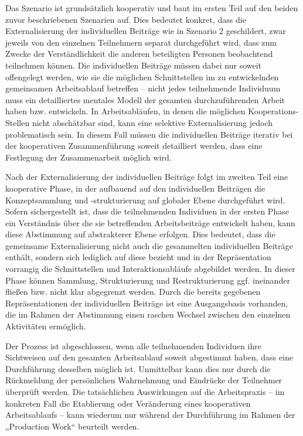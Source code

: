 Das Szenario ist grundsätzlich kooperativ und baut im ersten Teil auf den beiden zuvor beschriebenen Szenarien auf. Dies bedeutet konkret, dass die Externalisierung der individuellen Beiträge wie in Szenario 2 geschildert, zwar jeweils von den einzelnen Teilnehmern separat durchgeführt wird, dass zum Zwecke der Verständlichkeit die anderen beteiligten Personen beobachtend teilnehmen können. Die individuellen Beiträge müssen dabei nur soweit offengelegt werden, wie sie die möglichen Schnittstellen im zu entwickelnden gemeinsamen Arbeitsablauf betreffen -- nicht jedes teilnehmende Individuum muss ein detailliertes mentales Modell der gesamten durchzuführenden Arbeit haben bzw. entwickeln. In Arbeitsabläufen, in denen die möglichen Kooperations-Stellen nicht abschätzbar sind, kann eine selektive Externalisierung jedoch problematisch sein. In diesem Fall müssen die individuellen Beiträge iterativ bei der kooperativen Zusammenführung soweit detailliert werden, dass eine Festlegung der Zusammenarbeit möglich wird.

Nach der Externalisierung der individuellen Beiträge folgt im zweiten Teil eine kooperative Phase, in der aufbauend auf den individuellen Beiträgen die Konzeptsammlung und -strukturierung auf globaler Ebene durchgeführt wird. Sofern sichergestellt ist, dass die teilnehmenden Individuen in der ersten Phase ein Verständnis über die sie betreffenden Arbeitsbeiträge entwickelt haben, kann diese Abstimmung auf abstrakterer Ebene erfolgen. Dies bedeutet, dass die gemeinsame Externalisierung nicht auch die gesammelten individuellen Beiträge enthält, sondern sich lediglich auf diese bezieht und in der Repräsentation vorrangig die Schnittstellen und Interaktionsabläufe abgebildet werden. In dieser Phase können Sammlung, Strukturierung und Restrukturierung ggf. ineinander fließen bzw. nicht klar abgegrenzt werden. Durch die bereits gegebenen Repräsentationen der individuellen Beiträge ist eine Ausgangsbasis vorhanden, die im Rahmen der Abstimmung einen raschen Wechsel zwischen den einzelnen Aktivitäten ermöglich.

Der Prozess ist abgeschlossen, wenn alle teilnehmenden Individuen ihre Sichtweisen auf den gesamten Arbeitsablauf soweit abgestimmt haben, dass eine Durchführung desselben möglich ist. Unmittelbar kann dies nur durch die Rückmeldung der persönlichen Wahrnehmung und Eindrücke der Teilnehmer überprüft werden. Die tatsächlichen Auswirkungen auf die Arbeitspraxis -- im konkreten Fall die Etablierung oder Veränderung eines kooperativen Arbeitsablaufs -- kann wiederum nur während der Durchführung im Rahmen der „Production Work“ beurteilt werden.

